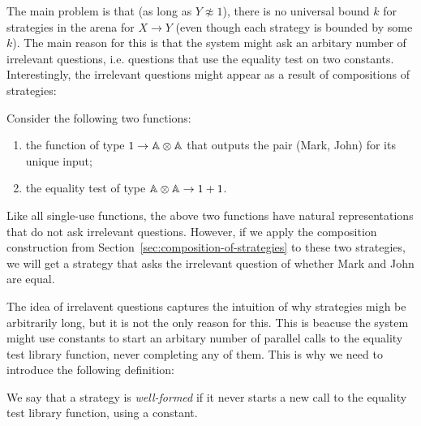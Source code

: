 The main problem is that (as long as $Y \not \approx 1$), there is no universal bound $k$ for strategies in the arena for $X \to Y$
(even though each strategy is bounded by some $k$). The main reason for this is that the system might ask an arbitary number of irrelevant questions, 
i.e. questions that use the equality test on two constants. Interestingly, the irrelevant questions might appear as a result of compositions of strategies:
\begin{example}\label{ex:irrelevant-questions-from-composition}
    Consider the  following two functions: 
    \begin{enumerate}
        \item the function of type  $1 \to \mathbb A \otimes \mathbb A$ that outputs the pair (Mark, John) for its unique input;
        \item the equality test of type $\mathbb A \otimes \mathbb A \to 1 + 1$.
    \end{enumerate}
    Like all single-use functions, the above two functions have natural representations that do not ask irrelevant questions.
    However, if we apply the composition construction from Section~\ref{sec:composition-of-strategies} to these two strategies, we will get a strategy that asks the irrelevant question of whether Mark and John are equal. \exampleend
\end{example}

The idea of irrelavent questions captures the intuition of why strategies migh be arbitrarily long, but it is not the only reason for this.
This is beacuse the system might use constants to start an arbitary number of parallel calls to the equality test library function, 
never completing any of them. This is why we need to introduce the following definition:
\begin{definition}
    We say that a strategy is \emph{well-formed} if it never starts a new call to the equality test library function, using a constant. 
\end{definition}

